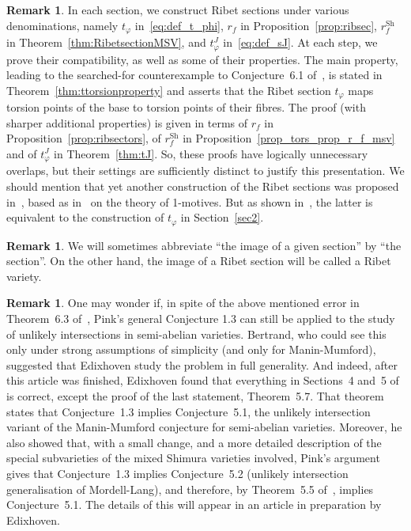 \documentclass[JEP,XML,SOM,Unicode,NoFloatCountersInSection]{cedram}
\theoremstyle{plain}
\theoremstyle{definition}
\newtheorem{Remark}[subsection]{Remark}
\numberwithin{equation}{subsection}
\let\phi\varphi
\newcommand{\Sh}{\mathrm{Sh}}
\begin{document}
\begin{Remark}
In each section, we construct Ribet sections under various
denominations, namely $t_\phi$ in~\eqref{eq:def_t_phi}, $r_f$ in
Proposition~\ref{prop:ribsec}, $r^\Sh_f$ in Theorem~\ref{thm:RibetsectionMSV},
and $t^J_\phi$ in~\eqref{eq:def_sJ}. At each step, we prove their
compatibility, as well as some of their properties. The main
property, leading to the searched-for counterexample to
Conjecture~6.1 of~\cite{Pink2}, is stated in
Theorem~\ref{thm:ttorsionproperty} and asserts that the Ribet section
$t_\phi$ maps torsion points of the base to torsion points of their
fibres. The proof (with sharper additional properties) is given in
terms of $r_f$ in Proposition~\ref{prop:ribsectors}, of $r^\Sh_f$ in
Proposition~\ref{prop_tors_prop_r_f_msv} and of
$t^J_\phi$ in Theorem~\ref{thm:tJ}. So, these proofs have logically
unnecessary overlaps, but their settings are sufficiently distinct
to justify this presentation. We should mention that yet another
construction of the Ribet sections was proposed
in~\cite{Bertrand11}, based as in~\cite{Jacquinot-Ribet} on the
theory of 1-motives. But as shown in~\cite{Chambert-Loir99}, the latter
is equivalent to the construction of $t_\phi$ in Section~\ref{sec2}.
\end{Remark}
\begin{Remark}
We will sometimes abbreviate ``the image of a given section'' by
``the section''. On the other hand, the image of a Ribet section
will be called a Ribet variety.
\end{Remark}
\begin{Remark}
One may wonder if, in spite of the above mentioned error in
Theorem~6.3 of~\cite{Pink2}, Pink's general Conjecture 1.3 can still
be applied to the study of unlikely intersections in semi-abelian
varieties. Bertrand, who could see this only under strong
assumptions of simplicity (and only for Manin-Mumford), suggested
that Edixhoven study the problem in full generality. And indeed,
after this article was finished, Edixhoven found that everything in
Sections~4 and~5 of~\cite{Pink2} is correct, except the proof of the
last statement, Theorem~5.7. That theorem states that Conjecture~1.3
implies Conjecture~5.1, the unlikely intersection variant of the
Manin-Mumford conjecture for semi-abelian varieties. Moreover, he
also showed that, with a small change, and a more detailed
description of the special subvarieties of the mixed Shimura
varieties involved, Pink's argument gives that Conjecture~1.3
implies Conjecture~5.2 (unlikely intersection generalisation of
Mordell-Lang), and therefore, by Theorem~5.5 of~\cite{Pink2},
implies Conjecture~5.1. The details of this will appear in an
article in preparation by Edixhoven.
\end{Remark}
\end{document}
